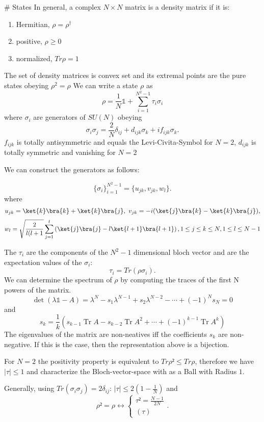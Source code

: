 # States
In general, a complex $N \times N$ matrix is a density matrix if it is:
\begin{enumerate}[label=(\roman*)]
	\item Hermitian,	$\rho =\rho^{\dagger}$
	\item positive,		$\rho \ge 0$
	\item normalized,	$Tr\rho = 1$
\end{enumerate}
The set of density matrices is convex set and its extremal points are the pure states obeying $\rho^2 = \rho$
We can write a state $\rho$ as
$$\rho = \frac{1}{N} \mathbb{1} + \sum_{i=1}^{N^2-1} \tau_i \sigma_i$$
where $\sigma_i$ are generators of $SU(N)$ obeying
\[
	\sigma_i\sigma_j = \frac{2}{N}\delta_{ij} + d_{ijk}\sigma_k + if_{ijk}\sigma_k
.\]
$f_{ijk}$ is totally antisymmetric and equals the Levi-Civita-Symbol for $N=2$, $d_{ijk}$ is totally symmetric and vanishing for $N=2$

We can construct the generators as follows:

 \[
\{\sigma_i\}^{N^2-1}_{i=1} = \{u_{jk},v_{jk},w_l\}
.\]
where
$$
	u_{jk} = \ket{k}\bra{k}+\ket{k}\bra{j}, ~ v_{jk} = -i(\ket{j}\bra{k}-\ket{k}\bra{j}),
$$
$$
	w_l = \sqrt{\frac{2}{l(l+1}} \sum_{j=1}^{l} \left( \ket{j}\bra{j}-l\ket{l+1}\bra{l+1} \right),
	1\le j\le k\le N, 1\le l\le N-1
$$

The $\tau_i$ are the components of the $N^2-1$ dimensional bloch vector and are the expectation values of the $\sigma_i$:
 \[
	 \tau_i = Tr(\rho\sigma_i)
.\]
We can determine the spectrum of $\rho$ by computing the traces of the first N powers of the matrix.
$$\operatorname{det}(\lambda \mathbb{1}-A)=\lambda^{N}-s_{1} \lambda^{N-1}+s_{2} \lambda^{N-2}-\cdots+(-1)^{N} s_{N}=0$$
and
$$s_{k}=\frac{1}{k}\left(s_{k-1} \operatorname{Tr} A-s_{k-2} \operatorname{Tr} A^{2}+\cdots+(-1)^{k-1} \operatorname{Tr} A^{k}\right)$$
The eigenvalues of the matrix are non-neatives iff the coefficients $s_k$ are non-negative.
If this is the case, then the representation above is a bijection.

For $N=2$ the positivity property is equivalent to $Tr\rho²\le Tr\rho$, therefore we have $|\tau|\le 1$ and characterize the Bloch-vector-space with as a Ball with Radius $1$.

Generally, using $Tr(\sigma_i\sigma_j) = 2\delta_{ij}$: $|\tau|\le 2\left( 1-\frac{1}{N} \right) $ and
\[
\rho²=\rho  \leftrightarrow \begin{cases}
	\tau² = \frac{N-1}{2N} \\
	\left( \tau \right)
\end{cases}
.\]


